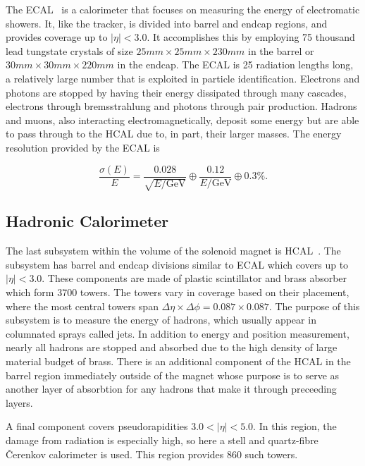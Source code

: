 The ECAL~\cite{ecaltdr} is a calorimeter that focuses on measuring the energy of electromatic showers.
It, like the tracker, is divided into barrel and endcap regions, and provides coverage up to
$|\eta| < 3.0$.
It accomplishes this by employing 75 thousand lead tungstate crystals of size
$25 mm \times 25 mm \times 230 mm$ in the barrel or $30 mm \times 30 mm \times 220 mm$ in the endcap.
The ECAL is 25 radiation lengths long, a relatively large number that is exploited in
particle identification. Electrons and photons are stopped by having their energy dissipated
through many cascades, electrons through bremsstrahlung and photons through pair production.
Hadrons and muons, also interacting electromagnetically, deposit some energy
but are able to pass through to the HCAL due to, in part, their larger masses. The energy resolution
provided by the ECAL is

\begin{equation}
\frac{\sigma(E)}{E} = \frac{0.028}{\sqrt{E/\textrm{GeV}}} \oplus \frac{0.12}{E/\textrm{GeV}} \oplus 0.3\% .
\end{equation}

\subsection{Hadronic Calorimeter\label{subsec:hcal}}

The last subsystem within the volume of the solenoid magnet is HCAL~\cite{hcaltdr}.
The subsystem has barrel and endcap divisions similar to ECAL which covers up to $|\eta| < 3.0$.
These components are made of plastic scintillator and brass absorber which form 3700 towers. The
towers vary in coverage based on their placement, where the most central towers span
$\Delta\eta \times \Delta\phi = 0.087 \times 0.087$. The purpose of this subsystem is to
measure the energy of hadrons, which usually appear in columnated sprays called jets. In addition
to energy and position measurement, nearly all hadrons are stopped and absorbed due to the
high density of large material budget of brass. There is an additional component of the HCAL
in the barrel region immediately outside of the magnet whose purpose is to serve as another
layer of absorbtion for any hadrons that make it through preceeding layers.

A final component covers pseudorapidities $3.0 < |\eta|< 5.0$. In this region, the damage from
radiation is especially high, so here a stell and quartz-fibre \v{C}erenkov calorimeter is used.
This region provides 860 such towers.

